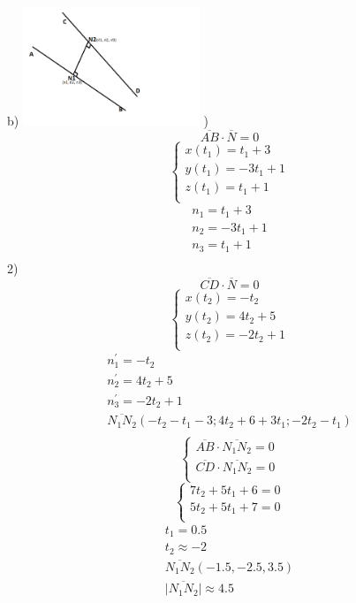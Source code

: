 \documentclass[11pt]{article}
\begin{document}
    b) \newline
    \includegraphics[width=200px]{taskOne.PNG} )
    \[\overline{AB}\cdot\overline{N}=0\]
    \[\begin{cases}
        x(t_1)=t_1+3   \\
        y(t_1)=-3t_1+1 \\
        z(t_1)=t_1+1   \\
    \end{cases}\]
    \begin{gather*}
        n_1=t_1+3\\
        n_2=-3t_1+1\\
        n_3=t_1+1\\
    \end{gather*}
    2)
    \[\overline{CD}\cdot\overline{N}=0\]
    \[\begin{cases}
          x(t_2)=-t_2    \\
          y(t_2)=4t_2+5  \\
          z(t_2)=-2t_2+1 \\
    \end{cases}\]
    \begin{gather*}
        n_1^\prime=-t_2\\
        n_2^\prime=4t_2+5\\
        n_3^\prime=-2t_2+1\\
        \overline{N_1N_2}(-t_2-t_1-3; 4t_2+6+3t_1; -2t_2-t_1)\\
    \end{gather*}
    \[\begin{cases}
          \overline{AB}\cdot\overline{N_1N_2}=0  \\
          \overline{CD}\cdot\overline{N_1N_2}=0  \\
    \end{cases}\]
    \[\begin{cases}
          7t_2+5t_1+6=0  \\
          5t_2+5t_1+7=0  \\
    \end{cases}\]
    \begin{gather*}
        t_1=0.5\\
        t_2\approx-2\\
        \overline{N_1N_2}(-1.5, -2.5, 3.5)\\
        \overline{|N_1N_2|}\approx4.5\\
    \end{gather*}
\end{document}
